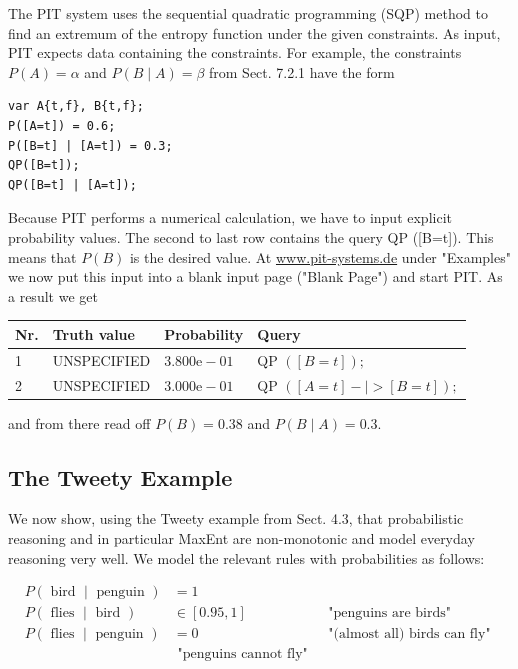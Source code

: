 \documentclass[10pt]{book}
\begin{document}
The PIT system uses the sequential quadratic programming (SQP) method to find an extremum of the entropy function under the given constraints. As input, PIT expects data containing the constraints. For example, the constraints $P(A)=\alpha$ and $P(B \mid A)=\beta$ from Sect. 7.2.1 have the form
\begin{verbatim}
var A{t,f}, B{t,f};
P([A=t]) = 0.6;
P([B=t] | [A=t]) = 0.3;
QP([B=t]);
QP([B=t] | [A=t]);
\end{verbatim}

Because PIT performs a numerical calculation, we have to input explicit probability values. The second to last row contains the query QP ([B=t]). This means that $P(B)$ is the desired value. At \href{http://www.pit-systems.de}{www.pit-systems.de} under "Examples" we now put this input into a blank input page ("Blank Page") and start PIT. As a result we get

\begin{center}
\begin{tabular}{llll}
\hline
Nr. & Truth value & Probability & Query \\
\hline
1 & UNSPECIFIED & $3.800 \mathrm{e}-01$ & QP $([B=t]) ;$ \\
\hline
2 & UNSPECIFIED & $3.000 \mathrm{e}-01$ & QP $([A=t]-\mid>[B=t]) ;$ \\
\hline
\end{tabular}
\end{center}

and from there read off $P(B)=0.38$ and $P(B \mid A)=0.3$.

\subsection{The Tweety Example}
We now show, using the Tweety example from Sect. 4.3, that probabilistic reasoning and in particular MaxEnt are non-monotonic and model everyday reasoning very well. We model the relevant rules with probabilities as follows:

$$
\begin{array}{lll}
P(\text { bird } \mid \text { penguin }) & =1 & \\
P(\text { flies } \mid \text { bird }) & \in[0.95,1] & \text { "penguins are birds" } \\
P(\text { flies } \mid \text { penguin }) & =0 & \text { "(almost all) birds can fly" } \\
& \text { "penguins cannot fly" }
\end{array}
$$
\end{document}

